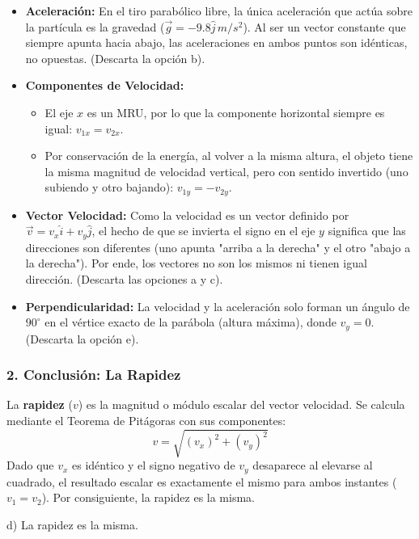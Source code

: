 \documentclass[12pt, a4paper]{article}
\begin{document}
\begin{itemize}
    \item \textbf{Aceleración:} En el tiro parabólico libre, la única aceleración que actúa sobre la partícula es la gravedad ($\vec{g} = -9.8\hat{j} \, \si{m/s^2}$). Al ser un vector constante que siempre apunta hacia abajo, las aceleraciones en ambos puntos son idénticas, no opuestas. (Descarta la opción b).
    \item \textbf{Componentes de Velocidad:} 
        \begin{itemize}
            \item El eje $x$ es un MRU, por lo que la componente horizontal siempre es igual: $v_{1x} = v_{2x}$.
            \item Por conservación de la energía, al volver a la misma altura, el objeto tiene la misma magnitud de velocidad vertical, pero con sentido invertido (uno subiendo y otro bajando): $v_{1y} = -v_{2y}$.
        \end{itemize}
    \item \textbf{Vector Velocidad:} Como la velocidad es un vector definido por $\vec{v} = v_x\hat{i} + v_y\hat{j}$, el hecho de que se invierta el signo en el eje $y$ significa que las direcciones son diferentes (uno apunta "arriba a la derecha" y el otro "abajo a la derecha"). Por ende, los vectores no son los mismos ni tienen igual dirección. (Descarta las opciones a y c).
    \item \textbf{Perpendicularidad:} La velocidad y la aceleración solo forman un ángulo de $90^\circ$ en el vértice exacto de la parábola (altura máxima), donde $v_y = 0$. (Descarta la opción e).
\end{itemize}

\subsubsection*{2. Conclusión: La Rapidez}
La \textbf{rapidez} ($v$) es la magnitud o módulo escalar del vector velocidad. Se calcula mediante el Teorema de Pitágoras con sus componentes:
$$ v = \sqrt{(v_x)^2 + (v_y)^2} $$
Dado que $v_x$ es idéntico y el signo negativo de $v_y$ desaparece al elevarse al cuadrado, el resultado escalar es exactamente el mismo para ambos instantes ($v_1 = v_2$). Por consiguiente, la rapidez es la misma.

\begin{tcolorbox}[colback=green!5!white, colframe=green!50!black, title=Respuesta Final]
\centering \Large d) La rapidez es la misma.
\end{tcolorbox}
\end{document}
